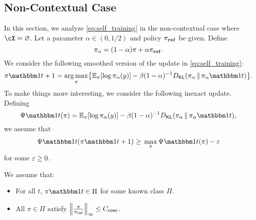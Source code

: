 \documentclass{article}
\begin{document}
  \subsection{Non-Contextual Case}
  \newcommand{\sm}{\alpha}
  \newcommand{\ystar}{y^{\star}}
  \newcommand{\ones}{\mb{1}}
  \newcommand{\pia}{\pi_{\alpha}}
In this section, we analyze \cref{eq:self_training} in the
non-contextual case where $\cX=\emptyset$. Let a parameter
$\sm\in(0,1/2)$ and policy $\piref$ be given. Define
\[
  \pi_\alpha = (1-\alpha)\pi + \alpha\piref.
\]
We consider the following smoothed version
of the update in \cref{eq:self_training}:
\begin{align}
  \pi\ind{t+1}=\argmax_{\pi}\crl*{
  \En_{\pi}\brk*{\log\pi_\alpha(y)}
  -\beta(1-\alpha)^{-1}\Dkl{\pi_\alpha}{\pi_\alpha\ind{t}}
  }.
\end{align}
To make things more interesting, we consider the following inexact
update. Defining
\[
\Psi\ind{t}(\pi) =     \En_{\pi}\brk*{\log\pi_\alpha(y)}
-\beta(1-\alpha)^{-1}\Dkl{\pi_\alpha}{\pi_\alpha\ind{t}},
\]
we assume that
\begin{align}
  \label{eq:pit}
\Psi\ind{t}(\pi\ind{t+1})\geq{}\max_{\pi}\Psi\ind{t}(\pi) - \veps
\end{align}
for some $\veps\geq{}0$.
\begin{assumption} We assume that:
  \begin{itemize}
  \item For all $t$, $\pi\ind{t}\in\Pi$ for some known class $\Pi$.
  \item All $\pi\in\Pi$ satisfy $\nrm*{\frac{\pi}{\piref}}_{\infty}\leq{}\Cconc$.
  \end{itemize}
  
\end{assumption}

\begin{theorem}
  \label{thm:bandit}
  
\end{theorem}
\end{document}
